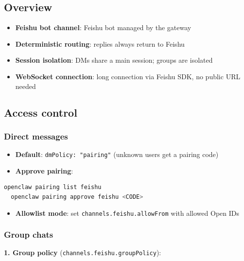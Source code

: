 \hrulefill


\subsection{Overview}


\begin{itemize}
  \item \textbf{Feishu bot channel}: Feishu bot managed by the gateway
  \item \textbf{Deterministic routing}: replies always return to Feishu
  \item \textbf{Session isolation}: DMs share a main session; groups are isolated
  \item \textbf{WebSocket connection}: long connection via Feishu SDK, no public URL needed
\end{itemize}


\hrulefill


\subsection{Access control}


\subsubsection{Direct messages}


\begin{itemize}
  \item \textbf{Default}: \texttt{dmPolicy: "pairing"} (unknown users get a pairing code)
  \item \textbf{Approve pairing}:
\end{itemize}


\begin{lstlisting}[language=bash]
  openclaw pairing list feishu
  openclaw pairing approve feishu <CODE>
\end{lstlisting}


\begin{itemize}
  \item \textbf{Allowlist mode}: set \texttt{channels.feishu.allowFrom} with allowed Open IDs
\end{itemize}


\subsubsection{Group chats}


\textbf{1. Group policy} (\texttt{channels.feishu.groupPolicy}):

